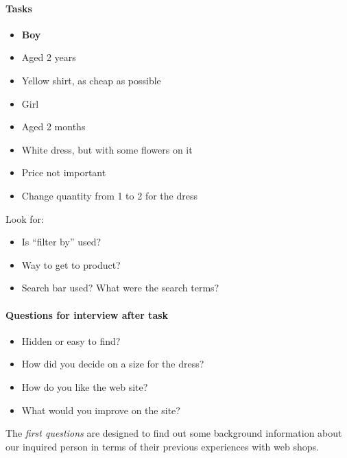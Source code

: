 \paragraph{Tasks}
\begin{itemize}\addtolength{\itemsep}{-0.5\baselineskip}
 \item \textbf{Boy}
 \item Aged 2 years
 \item Yellow shirt, as cheap as possible
\end{itemize}
\begin{itemize}\addtolength{\itemsep}{-0.5\baselineskip}
 \item Girl
 \item Aged 2 months
 \item White dress, but with some flowers on it
 \item Price not important
\end{itemize}
\begin{itemize}
 \item Change quantity from 1 to 2 for the dress
\end{itemize}

Look for:
\begin{itemize}\addtolength{\itemsep}{-0.5\baselineskip}
 \item Is ``filter by'' used?
 \item Way to get to product?
 \item Search bar used? What were the search terms?
\end{itemize}

\paragraph{Questions for interview after task}
\begin{itemize}\addtolength{\itemsep}{-0.5\baselineskip}
 \item Hidden or easy to find?
 \item How did you decide on a size for the dress?
 \item How do you like the web site?
 \item What would you improve on the site?
\end{itemize}

\newpage

\label{sec:inquiry_explanations}
The \textit{first questions} are designed to find out some background information about our inquired person in terms of their previous experiences with web shops. 

